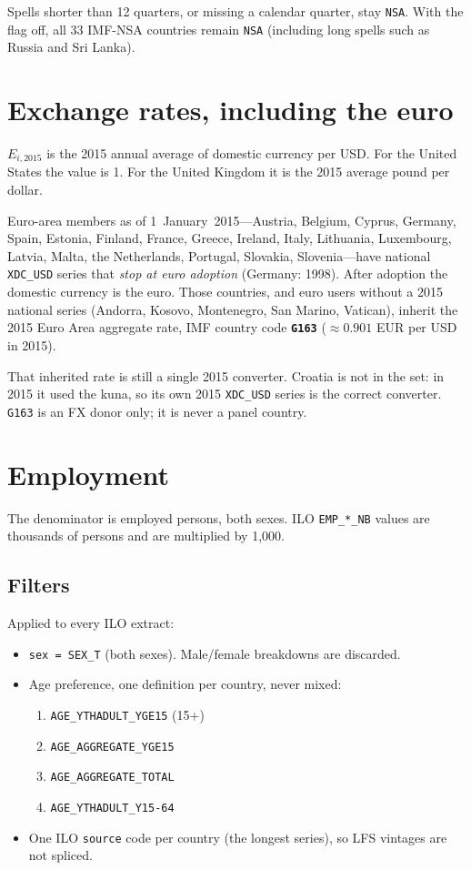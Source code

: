 \documentclass[11pt]{article}
\begin{document}
Spells shorter than 12 quarters, or missing a calendar quarter, stay
\texttt{NSA}. With the flag off, all 33 IMF-NSA countries remain
\texttt{NSA} (including long spells such as Russia and Sri Lanka).

\section{Exchange rates, including the euro}

$E_{i,2015}$ is the 2015 annual average of domestic currency per USD. For the
United States the value is 1. For the United Kingdom it is the 2015 average
pound per dollar.

Euro-area members as of 1~January~2015---Austria, Belgium, Cyprus, Germany,
Spain, Estonia, Finland, France, Greece, Ireland, Italy, Lithuania,
Luxembourg, Latvia, Malta, the Netherlands, Portugal, Slovakia,
Slovenia---have national \texttt{XDC\_USD} series that \emph{stop at euro
adoption} (Germany: 1998). After adoption the domestic currency is the euro.
Those countries, and euro users without a 2015 national series (Andorra,
Kosovo, Montenegro, San Marino, Vatican), inherit the 2015 Euro Area
aggregate rate, IMF country code \textbf{\texttt{G163}}
($\approx 0.901$ EUR per USD in 2015).

That inherited rate is still a single 2015 converter. Croatia is not in the
set: in 2015 it used the kuna, so its own 2015 \texttt{XDC\_USD} series is the
correct converter. \texttt{G163} is an FX donor only; it is never a panel
country.

\section{Employment}
\label{sec:emp}

The denominator is employed persons, both sexes. ILO \texttt{EMP\_*\_NB}
values are thousands of persons and are multiplied by 1{,}000.

\subsection{Filters}

Applied to every ILO extract:

\begin{itemize}
\item \texttt{sex = SEX\_T} (both sexes). Male/female breakdowns are discarded.
\item Age preference, one definition per country, never mixed:
\begin{enumerate}
\item \texttt{AGE\_YTHADULT\_YGE15} (15+)
\item \texttt{AGE\_AGGREGATE\_YGE15}
\item \texttt{AGE\_AGGREGATE\_TOTAL}
\item \texttt{AGE\_YTHADULT\_Y15-64}
\end{enumerate}
\item One ILO \texttt{source} code per country (the longest series), so LFS
vintages are not spliced.
\end{itemize}
\end{document}

